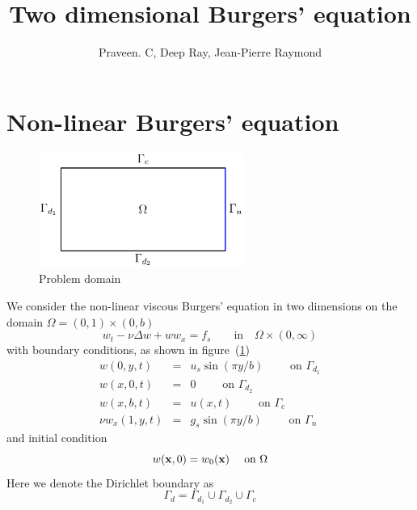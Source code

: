 \documentclass[12pt]{article}
\title{Two dimensional Burgers' equation}
\author{Praveen. C, Deep Ray, Jean-Pierre Raymond}
\begin{document}
\maketitle

\section{Non-linear Burgers' equation}
\begin{figure}[h]
\begin{center}
\includegraphics[width=0.6\textwidth]{burger2d_domain}
\caption{Problem domain}
\label{fig:domain}
\end{center}
\end{figure}
We consider the non-linear viscous Burgers' equation in two dimensions on the domain $\Omega = (0,1) \times (0,b)$
\begin{equation*}
w_t -\nu \Delta w + w w_{x} = f_s \qquad \mbox{in} \quad \Omega \times (0,\infty)
\end{equation*}
with boundary conditions, as shown in figure~(\ref{fig:domain})
\begin{eqnarray*}
w(0,y,t) &=& u_s \sin(\pi y/b) \qquad \mbox{ on } \Gamma_{d_1} \\
w(x,0,t) &=& 0 \qquad \mbox{ on } \Gamma_{d_2} \\
w(x,b,t) &=& u(x,t) \qquad \mbox{ on } \Gamma_c \\
\nu w_x(1,y,t) &=& g_s \sin(\pi y/b) \qquad \mbox{ on } \Gamma_n
\end{eqnarray*}
and initial condition
\begin{equation*}
w({\mathbf x},0) = w_0({\mathbf x}) \quad \text{ on } \Omega
\end{equation*}
Here we denote the Dirichlet boundary as
\[
 \Gamma_d = \Gamma_{d_1} \cup \Gamma_{d_2} \cup \Gamma_c
\]
\end{document}
